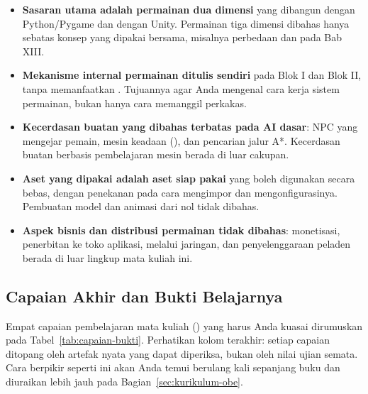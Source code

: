 \begin{itemize}
  \item \textbf{Sasaran utama adalah permainan dua dimensi} yang dibangun
        dengan Python/Pygame dan dengan Unity. Permainan tiga dimensi dibahas
        hanya sebatas konsep yang dipakai bersama, misalnya perbedaan
         dan  pada Bab XIII.
  \item \textbf{Mekanisme internal permainan ditulis sendiri} pada Blok I dan
        Blok II, tanpa memanfaatkan . Tujuannya agar Anda
        mengenal cara kerja sistem permainan, bukan hanya cara memanggil
        perkakas.
  \item \textbf{Kecerdasan buatan yang dibahas terbatas pada AI dasar}: NPC
        yang mengejar pemain, mesin keadaan (),
        dan pencarian jalur A*. Kecerdasan buatan berbasis pembelajaran mesin
        berada di luar cakupan.
  \item \textbf{Aset yang dipakai adalah aset siap pakai} yang boleh
        digunakan secara bebas, dengan penekanan pada cara mengimpor dan
        mengonfigurasinya. Pembuatan model dan animasi dari nol tidak dibahas.
  \item \textbf{Aspek bisnis dan distribusi permainan tidak dibahas}:
        monetisasi, penerbitan ke toko aplikasi, 
        melalui jaringan, dan penyelenggaraan peladen berada di luar lingkup
        mata kuliah ini.
\end{itemize}

\subsection{Capaian Akhir dan Bukti Belajarnya}

Empat capaian pembelajaran mata kuliah (\CPMK) yang harus Anda kuasai
dirumuskan pada Tabel~\ref{tab:capaian-bukti}. Perhatikan kolom terakhir:
setiap capaian ditopang oleh artefak nyata yang dapat diperiksa, bukan oleh
nilai ujian semata. Cara berpikir seperti ini akan Anda temui berulang kali
sepanjang buku dan diuraikan lebih jauh pada
Bagian~\ref{sec:kurikulum-obe}.

